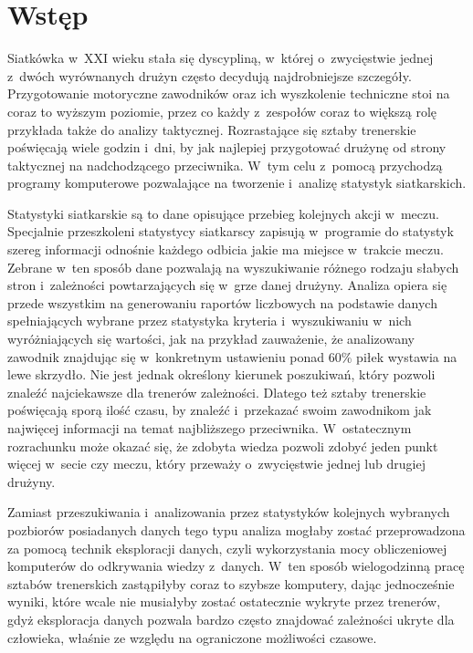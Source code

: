 \documentclass[a4paper,twoside,12pt]{book}
\newcounter{stronyPozaNumeracja}
\begin{document}
 

\cleardoublepage


\pagestyle{tylkoNumeryStron}
\tableofcontents

\setcounter{stronyPozaNumeracja}{\value{page}}
\mainmatter
\pagestyle{NumeryStronNazwyRozdzialow}


\chapter{Wstęp}

Siatkówka w~XXI wieku stała się dyscypliną, w~której o~zwycięstwie jednej z~dwóch wyrównanych drużyn często decydują najdrobniejsze szczegóły. Przygotowanie motoryczne zawodników oraz ich wyszkolenie techniczne stoi na coraz to wyższym poziomie, przez co każdy z~zespołów coraz to większą rolę przykłada także do analizy taktycznej. Rozrastające się sztaby trenerskie poświęcają wiele godzin i~dni, by jak najlepiej przygotować drużynę od strony taktycznej na nadchodzącego przeciwnika. W~tym celu z~pomocą przychodzą programy komputerowe pozwalające na tworzenie i~analizę statystyk siatkarskich.

Statystyki siatkarskie są to dane opisujące przebieg kolejnych akcji w~meczu. Specjalnie przeszkoleni statystycy siatkarscy zapisują w~programie do statystyk szereg informacji odnośnie każdego odbicia jakie ma miejsce w~trakcie meczu. Zebrane w~ten sposób dane pozwalają na wyszukiwanie różnego rodzaju słabych stron i~zależności powtarzających się w~grze danej drużyny. Analiza opiera się przede wszystkim na generowaniu raportów liczbowych na podstawie danych spełniających wybrane przez statystyka kryteria i~wyszukiwaniu w~nich wyróżniających się wartości, jak na przykład zauważenie, że analizowany zawodnik znajdując się w~konkretnym ustawieniu ponad 60\% piłek wystawia na lewe skrzydło. Nie jest jednak określony kierunek poszukiwań, który pozwoli znaleźć najciekawsze dla trenerów zależności. Dlatego też sztaby trenerskie poświęcają sporą ilość czasu, by znaleźć i~przekazać swoim zawodnikom jak najwięcej informacji na temat najbliższego przeciwnika. W~ostatecznym rozrachunku może okazać się, że zdobyta wiedza pozwoli zdobyć jeden punkt więcej w~secie czy meczu, który przeważy o~zwycięstwie jednej lub drugiej drużyny. 

Zamiast przeszukiwania i~analizowania przez statystyków kolejnych wybranych pozbiorów posiadanych danych tego typu analiza mogłaby zostać przeprowadzona za pomocą technik eksploracji danych, czyli wykorzystania mocy obliczeniowej komputerów do odkrywania wiedzy z~danych. W~ten sposób wielogodzinną pracę sztabów trenerskich zastąpiłyby coraz to szybsze komputery, dając jednocześnie wyniki, które wcale nie musiałyby zostać ostatecznie wykryte przez trenerów, gdyż eksploracja danych pozwala bardzo często znajdować zależności ukryte dla człowieka, właśnie ze względu na ograniczone możliwości czasowe.
\end{document}
